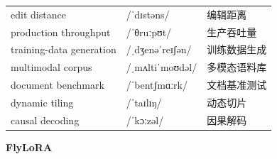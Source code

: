 \documentclass[UTF8,12pt,a4paper]{ctexart}
\providecommand{\zh}[1]{#1}
\begin{document}
\begin{tabular*}{\textwidth}{@{\extracolsep{\fill}}lll@{}}
edit distance & {\ipafont /ˈdɪstəns/} & \zh{编辑距离} \\
production throughput & {\ipafont /ˈθruːpʊt/} & \zh{生产吞吐量} \\
training-data generation & {\ipafont /ˌdʒenəˈreɪʃən/} & \zh{训练数据生成} \\
multimodal corpus & {\ipafont /ˌmʌltiˈmoʊdəl/} & \zh{多模态语料库} \\
document benchmark & {\ipafont /ˈbentʃmɑːrk/} & \zh{文档基准测试} \\
dynamic tiling & {\ipafont /ˈtaɪlɪŋ/} & \zh{动态切片} \\
causal decoding & {\ipafont /ˈkɔːzəl/} & \zh{因果解码} \\
\bottomrule
\end{tabular*}

\newpage

\begin{center}
    {\Large\bfseries FlyLoRA}
\end{center}
\end{document}
